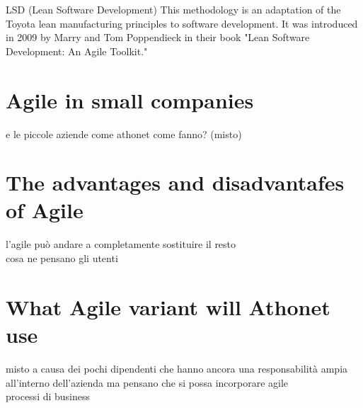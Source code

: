 	




LSD (Lean Software Development)
This methodology is an adaptation of the Toyota lean manufacturing principles to software development. It was introduced in 2009 by Marry and Tom Poppendieck in their book "Lean Software Development: An Agile Toolkit."

\section{Agile in small companies}
	e le piccole aziende come athonet come fanno? (misto)

\section{The advantages and disadvantafes of Agile}
	l'agile può andare a completamente sostituire il resto\\
	cosa ne pensano gli utenti

\section{What Agile variant will Athonet use}
	misto a causa dei pochi dipendenti che hanno ancora una responsabilità ampia all'interno dell'azienda ma pensano che si possa incorporare agile\\
	processi di business


